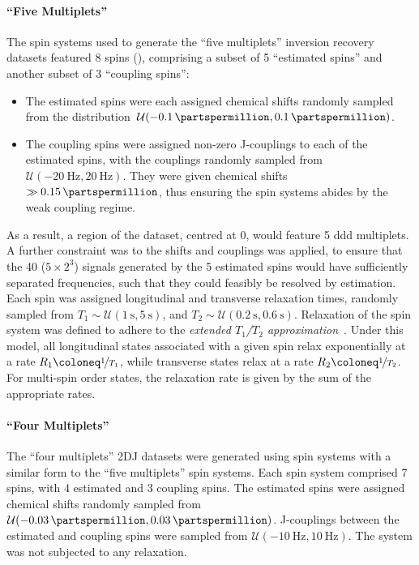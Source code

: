 \paragraph{``Five Multiplets''}
The spin systems used to generate the ``five multiplets'' inversion recovery
datasets featured 8 spins (), comprising a subset of 5 ``estimated
spins'' and another subset of 3 ``coupling spins'':
\begin{itemize}
    \item The estimated spins were each assigned chemical shifts randomly
        sampled from the distribution
        \,$\mathcal{U}(\qty{-0.1}{\partspermillion}, \qty{0.1}{\partspermillion})$.
    \item The coupling spins were assigned non-zero J-couplings to each of the
        estimated spins, with the couplings randomly sampled from
        \,$\mathcal{U}(\qty{-20}{\hertz}, \qty{20}{\hertz})$.
        They were given chemical shifts $\gg
        \qty{0.15}{\partspermillion}$, thus ensuring the spin systems abides by
        the weak coupling regime.
\end{itemize}
As a result, a region of the dataset, centred at \qty{0}{\partspermillion},
would feature 5 ddd multiplets.
A further constraint was to the shifts and couplings was applied, to ensure
that the 40 ($5 \times 2^3$) signals generated by the 5 estimated spins would
have sufficiently separated frequencies, such that they could feasibly be
resolved by estimation.  Each spin was assigned longitudinal and transverse
relaxation times, randomly sampled from $T_1 \sim \mathcal{U}(\qty{1}{\second},
\qty{5}{\second})$, and $T_2 \sim \mathcal{U}(\qty{0.2}{\second},
\qty{0.6}{\second})$.
Relaxation of the spin system was defined to adhere to the \emph{extended
$T_1$/$T_2$ approximation}~\cite{SpinachRelax}. Under this model, all
longitudinal states associated with a given spin relax exponentially at a rate
$R_1 \coloneq \nicefrac{1}{T_1}$, while transverse states relax at a rate $R_2
\coloneq \nicefrac{1}{T_2}$. For multi-spin order states, the relaxation rate
is given by the sum of the appropriate rates.

\paragraph{``Four Multiplets''}
The ``four multiplets'' \ac{2DJ} datasets were generated using spin systems
with a similar form to the ``five multiplets'' spin systems. Each spin system
comprised 7 spins, with 4 estimated and 3 coupling spins. The estimated spins
were assigned chemical shifts randomly sampled from
$\mathcal{U}(-\qty{0.03}{\partspermillion}, \qty{0.03}{\partspermillion})$.
J-couplings between the estimated and coupling spins were sampled from
$\mathcal{U}(\qty{-10}{\hertz}, \qty{10}{\hertz})$. The system was not
subjected to any relaxation.

